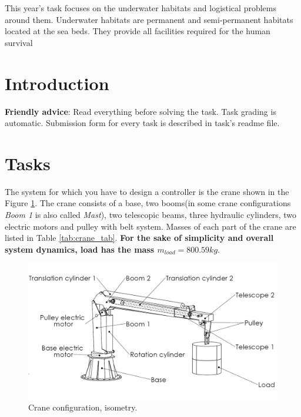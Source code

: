 \documentclass{article}
\begin{document}
	This year's task focuses on the underwater habitats and logistical problems 
	around them.
	Underwater habitats are permanent and semi-permanent habitats located at 
	the sea beds.
	They provide all facilities required for the human survival
	
	\newpage
	\section{Introduction}
	
	\noindent 
	\textbf{Friendly advice}: Read everything before solving the task. Task grading is automatic. Submission form for every task is described in task's readme file.
	
	\section{Tasks} \label{sec:tasks}
	
	The system for which you have to design a controller is the crane shown in the Figure \ref{fig:isometry}. The crane consists of a base, two booms(in some crane configurations \textit{Boom 1} is also called \textit{Mast}), two telescopic beams, three hydraulic cylinders, two electric motors and pulley with belt system. Masses of each part of the crane are listed in Table \ref{tab:crane_tab}.\textbf{ For the sake of simplicity and overall system dynamics, load has the mass $m_{load} = 800.59 kg$}.
	
	\begin{figure}[h!]
		\centering
		\includegraphics[width=\textwidth]{kran_teret_izometrija.jpg}
		\caption{Crane configuration, isometry.}
		\label{fig:isometry}
	\end{figure}
	
\end{document}
